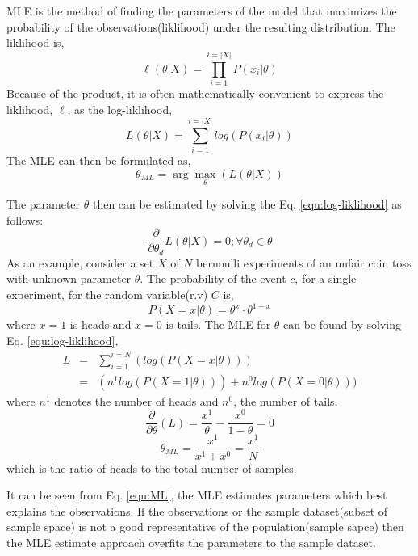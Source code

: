 MLE is the method of finding the parameters of the model that maximizes the probability of the observations(liklihood) under the resulting distribution. The liklihood is,
\begin{equation}
\ell(\theta|X) = \prod _{i=1}^{i=|X|} P(x_{i}|\theta)
\end{equation}
Because of the product, it is often mathematically convenient to express the liklihood, $\ell$, as the log-liklihood,
\begin{equation}
L(\theta|X) = \sum_{i=1}^{i=|X|} log(P(x_{i}|\theta))
\end{equation}
The MLE can then be formulated as,
\begin{equation}
\label{equ:log-liklihood}
\theta_{ML} = \arg \! \max_\theta(L(\theta|X))
\end{equation}

The parameter $\theta$ then can be estimated by solving the Eq. \ref{equ:log-liklihood} as follows:
\begin{equation}
\frac{\partial}{\partial\theta_{d}} L(\theta|X) = 0; \forall \theta_{d} \in \theta
\end{equation}
As an example, consider a set $X$ of $N$ bernoulli experiments of an unfair coin toss with unknown parameter $\theta$. The probability of the event $c$, for a single experiment, for the random variable(r.v) $C$ is,
\begin{equation}
P(X=x|\theta) = \theta^{x}\cdot\theta^{1-x} 
\end{equation}
where $x=1$ is heads and $x=0$ is tails.
The MLE for $\theta$ can be found by solving Eq. \ref{equ:log-liklihood},
\begin{eqnarray}
L & = & \sum_{i=1}^{i=N}(log(P(X=x|\theta))) \\
 & = & (n^{1}log(P(X=1|\theta))) + n^{0}log(P(X=0|\theta)))
\end{eqnarray}
where $n^{1}$ denotes the number of heads and $n^{0}$, the number of tails.
\begin{equation}
\frac{\partial}{\partial\theta}(L) = \frac{x^{1}}{\theta} - \frac{x^{0}}{1-\theta}=0 
\end{equation}
\begin{equation}
\label{equ:ML}
\theta_{ML} = \frac{x^{1}}{x^{1}+x^{0}} = \frac{x^{1}}{N} 
\end{equation}
which is the ratio of heads to the total number of samples. 

It can be seen from Eq. \ref{equ:ML}, the MLE estimates parameters which best explains the observations. If the observations or the sample dataset(subset of sample space) is not a good representative of the population(sample sapce) then the MLE estimate approach overfits the parameters to the sample dataset.